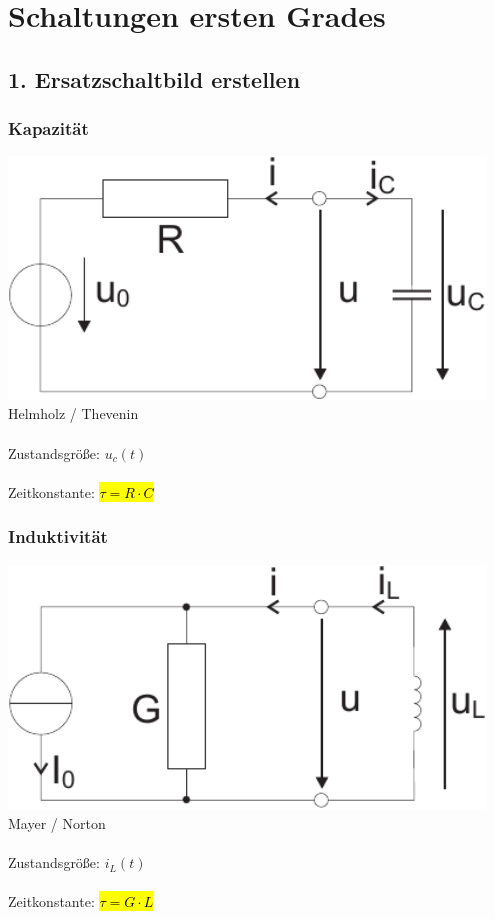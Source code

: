 \documentclass[a4paper,twocolumn,10pt]{article}
\begin{document}
\section*{Schaltungen ersten Grades}
\subsection*{1. Ersatzschaltbild erstellen}
\begin{minipage}[t]{0.23\textwidth}
\subsubsection*{Kapazität}
\includegraphics[width=0.95\textwidth]{img/Helmholz-Thevenin}\\
Helmholz / Thevenin\\\\
Zustandsgröße: $u_c(t)$\\\\
Zeitkonstante: \hl{$\tau = R\cdot C$}
\end{minipage}
\hfill
\begin{minipage}[t]{0.23\textwidth}
\subsubsection*{Induktivität}
\includegraphics[width=0.95\textwidth]{img/Mayer-Norton}\\
Mayer / Norton\\\\
Zustandsgröße: $i_L(t)$\\\\
Zeitkonstante: \hl{$\tau = G\cdot L$}
\end{minipage}
\end{document}
